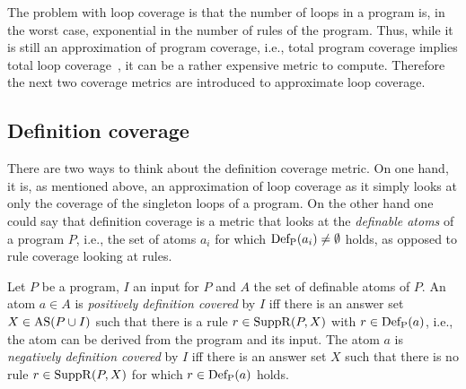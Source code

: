 The problem with loop coverage is that the number of loops in a program is, in the worst case, exponential in the number of rules of the program. Thus, while it is still an approximation of program coverage, i.e., total program coverage implies total loop coverage~\cite{Jan+10}, it can be a rather expensive metric to compute. Therefore the next two coverage metrics are introduced to approximate loop coverage.

\subsection{Definition coverage}
\label{subsec:Coverage metrics/Branch-like coverage/Definition coverage}
There are two ways to think about the definition coverage metric. On one hand, it is, as mentioned above, an approximation of loop coverage as it simply looks at only the coverage of the singleton loops of a program. On the other hand one could say that definition coverage is a metric that looks at the \emph{definable atoms} of a program $P$, i.e., the set of atoms $a_i$ for which \(\operatorname{Def_P}(a_i) \neq \emptyset\) holds, as opposed to rule coverage looking at rules.

\begin{definition}
\label{def:definition coverage}
    Let $P$ be a program, $I$ an input for $P$ and $A$ the set of definable atoms of $P$. An atom \(a \in A\) is \emph{positively definition covered} by $I$ iff there is an answer set \(X \in \operatorname{AS}(P \cup I)\) such that there is a rule \(r \in \operatorname{SuppR}(P, X)\) with \(r \in \operatorname{Def_P}(a)\), i.e., the atom can be derived from the program and its input.
    The atom $a$ is \emph{negatively definition covered} by $I$ iff there is an answer set $X$ such that there is no rule \(r \in \operatorname{SuppR}(P, X)\) for which \(r \in \operatorname{Def_P}(a)\) holds.
\end{definition}

